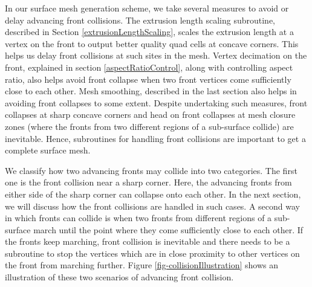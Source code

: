 In our surface mesh generation scheme, we take several measures to avoid or delay advancing front collisions. The extrusion length scaling subroutine, described in Section \ref{extrusionLengthScaling}, scales the extrusion length at a vertex on the front to output better quality quad cells at concave corners. This helps us delay front collisions at such sites in the mesh. Vertex decimation on the front, explained in section \ref{aspectRatioControl}, along with controlling aspect ratio, also helps avoid front collapse when two front vertices come sufficiently close to each other. Mesh smoothing, described in the last section also helps in avoiding front collapses to some extent. Despite undertaking such measures, front collapses at sharp concave corners and head on front collapses at mesh closure zones (where the fronts from two different regions of a sub-surface collide) are inevitable. Hence, subroutines for handling front collisions are important to get a complete surface mesh.

We classify how two advancing fronts may collide into two categories. The first one is the front collision near a sharp corner. Here, the advancing fronts from either side of the sharp corner can collapse onto each other. In the next section, we will discuss how the front collisions are handled in such cases. A second way in which fronts can collide is when two fronts from different regions of a sub-surface march until the point where they come sufficiently close to each other. If the fronts keep marching, front collision is inevitable and there needs to be a subroutine to stop the vertices which are in close proximity to other vertices on the front from marching further. Figure \ref{fig-collisionIllustration} shows an illustration of these two scenarios of advancing front collision.

